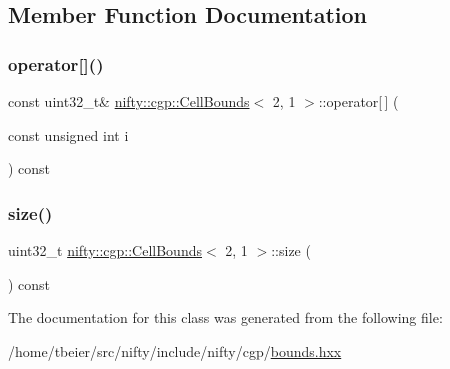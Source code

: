 \subsection{Member Function Documentation}
\mbox{\label{classnifty_1_1cgp_1_1CellBounds_3_012_00_011_01_4_a52b2e95c087965d796e6562b6a7560b7}} 
\subsubsection{\texorpdfstring{operator[]()}{operator[]()}}
{\footnotesize\ttfamily const uint32\+\_\+t\& \hyperlink{classnifty_1_1cgp_1_1CellBounds}{nifty\+::cgp\+::\+Cell\+Bounds}$<$ 2, 1 $>$\+::operator\mbox{[}$\,$\mbox{]} (\begin{DoxyParamCaption}\item[{const unsigned int}]{i }\end{DoxyParamCaption}) const\hspace{0.3cm}{\ttfamily [inline]}}

\mbox{\label{classnifty_1_1cgp_1_1CellBounds_3_012_00_011_01_4_ac39c866128b3b23a183050061d78df5b}} 
\subsubsection{\texorpdfstring{size()}{size()}}
{\footnotesize\ttfamily uint32\+\_\+t \hyperlink{classnifty_1_1cgp_1_1CellBounds}{nifty\+::cgp\+::\+Cell\+Bounds}$<$ 2, 1 $>$\+::size (\begin{DoxyParamCaption}{ }\end{DoxyParamCaption}) const\hspace{0.3cm}{\ttfamily [inline]}}



The documentation for this class was generated from the following file\+:\begin{DoxyCompactItemize}
\item 
/home/tbeier/src/nifty/include/nifty/cgp/\hyperlink{bounds_8hxx}{bounds.\+hxx}\end{DoxyCompactItemize}
